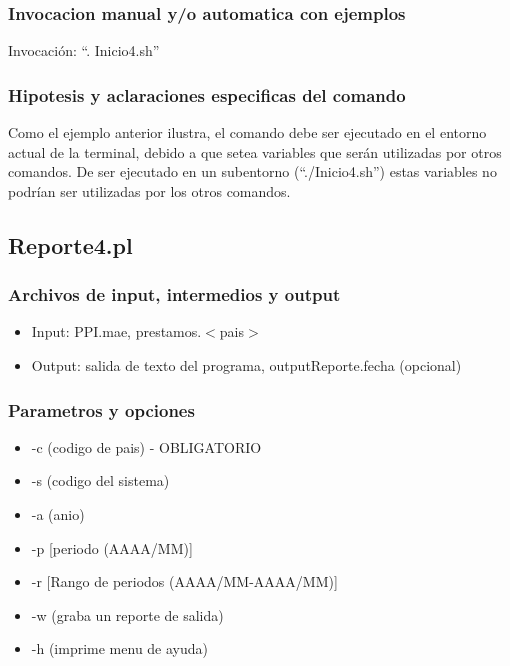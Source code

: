 \documentclass{article}
\begin{document}
		\subsubsection{Invocacion manual y/o automatica con ejemplos}
		Invocación: ``. Inicio4.sh''
		\subsubsection{Hipotesis y aclaraciones especificas del comando}
		Como el ejemplo anterior ilustra, el comando debe ser ejecutado en el entorno actual de la terminal, debido a que setea variables que serán utilizadas por otros comandos. De ser ejecutado en un subentorno (``./Inicio4.sh'') estas variables no podrían ser utilizadas por los otros comandos.
	
	\subsection{Reporte4.pl}
	
		\subsubsection{Archivos de input, intermedios y output}
		\begin{itemize}
			\item Input: PPI.mae, prestamos.$<$pais$>$
			\item Output: salida de texto del programa, outputReporte.fecha (opcional) 
		\end{itemize}
		\subsubsection{Parametros y opciones}
			\begin{itemize} 
				\item -c (codigo de pais) - OBLIGATORIO
				\item -s (codigo del sistema)
				\item -a (anio)
				\item -p [periodo (AAAA/MM)]
				\item -r [Rango de periodos (AAAA/MM-AAAA/MM)]
				\item -w (graba un reporte de salida)
				\item -h (imprime menu de ayuda)
			\end{itemize}
\end{document}
